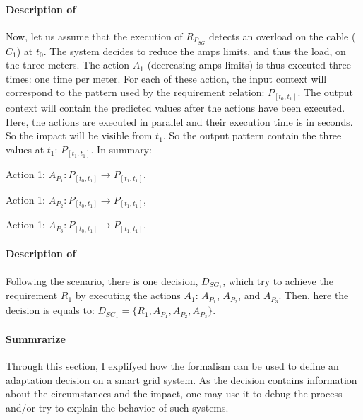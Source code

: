 \paragraph{Description of }
Now, let us assume that the execution of $R_{P_{SG}}$ detects an overload on the cable ($C_1$) at $t_0$.
The system decides to reduce the amps limits, and thus the load, on the three meters.
The action $A_1$ (decreasing amps limits) is thus executed three times: one time per meter.
For each of these action, the input context will correspond to the pattern used by the requirement relation: $P_{[t_0, t_1]}$.
The output context will contain the predicted values after the actions have been executed.
Here, the actions are executed in parallel and their execution time is in seconds.
So the impact will be visible from $t_1$.
So the output pattern contain the three values at $t_1$:  $P_{[t_1, t_1]}$.
In summary:
\begin{condItemize}
	\item Action 1: $A_{P_1}: P_{[t_0, t_1]} \rightarrow P_{[t_1, t_1]}$,
	\item Action 1: $A_{P_2}: P_{[t_0, t_1]} \rightarrow P_{[t_1, t_1]}$,
	\item Action 1: $A_{P_3}: P_{[t_0, t_1]} \rightarrow P_{[t_1, t_1]}$.
\end{condItemize}


\paragraph{Description of }
Following the scenario, there is one decision, $D_{SG_1}$, which try to achieve the requirement $R_1$ by executing the actions $A_1$: $A_{P_1}$, $A_{P_2}$, and $A_{P_3}$.
Then, here the decision is equals to: $D_{SG_1} = \{R_1, A_{P_1}, A_{P_2}, A_{P_3}\}$.

\paragraph{Summrarize}
Through this section, I explifyed how the formalism can be used to define an adaptation decision on a smart grid system.
As the decision contains information about the circumstances and the impact, one may use it to debug the process and/or try to explain the behavior of such systems.